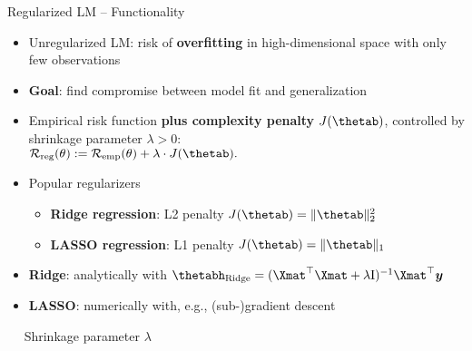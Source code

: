 \begin{frame}{Regularized LM -- Functionality}

  
\medskip


\begin{itemize}
  \item Unregularized LM: risk of \textbf{overfitting} in high-dimensional 
  space with only few observations
  \item \textbf{Goal}: find compromise between model fit and generalization
\end{itemize}

\medskip




\medskip


\begin{itemize}
  \item Empirical risk function \textbf{plus complexity penalty} 
  $J(\thetab)$, controlled by shrinkage parameter $\lambda > 0$: \\
  $\riskrt := \risket + \lambda \cdot J(\thetab).$ 
  \item Popular regularizers
  \begin{itemize} \footnotesize
    \item \textbf{Ridge regression}: L2 penalty $J(\thetab) = \|\thetab\|_2^2 $
    \item \textbf{LASSO regression}: L1 penalty $J(\thetab) = \|\thetab\|_1 $
  \end{itemize}
\end{itemize}

\medskip

\begin{itemize}
  \item \textbf{Ridge}: analytically with 
  $\thetabh_{\text{Ridge}} = (\Xmat^\top \Xmat  + \lambda \id)^{-1} \Xmat^\top 
  \yv$
  \item \textbf{LASSO}: numerically with, e.g., (sub-)gradient descent
\end{itemize}

\medskip

 ~~ Shrinkage parameter $\lambda$

\medskip


\end{frame}

